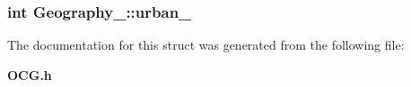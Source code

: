\subsubsection[{urban\_\-}]{\setlength{\rightskip}{0pt plus 5cm}int {\bf Geography\_\-::urban\_\-}}\label{structGeography___60bd273a1d8d31e9905dd2c66e042ccc}




The documentation for this struct was generated from the following file:\begin{CompactItemize}
\item 
{\bf OCG.h}\end{CompactItemize}
